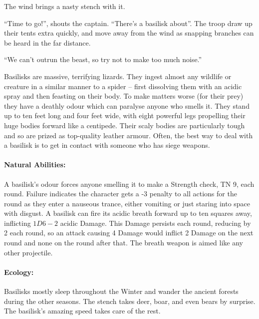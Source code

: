 \begin{multicols}{2}
\label{basilisk}
\basilisk

\begin{boxtext}

	The wind brings a nasty stench with it.

	``Time to go!'', shouts the captain.
	``There's a basilisk about''.
	The troop draw up their tents extra quickly, and move away from the wind as snapping branches can be heard in the far distance.

	``We can't outrun the beast, so try not to make too much noise.''

\end{boxtext}

Basilisks are massive, terrifying lizards.
They ingest almost any wildlife or creature in a similar manner to a spider -- first dissolving them with an acidic spray and then feasting on their body.
To make matters worse (for their prey) they have a deathly odour which can paralyse anyone who smells it.
They stand up to ten feet long and four feet wide, with eight powerful legs propelling their huge bodies forward like a centipede.
Their scaly bodies are particularly tough and so are prized as top-quality leather armour.
Often, the best way to deal with a basilisk is to get in contact with someone who has siege weapons.

\paragraph{Natural Abilities:} A basilisk's odour forces anyone smelling it to make a Strength check, TN 9, each round.
Failure indicates the character gets a -3 penalty to all actions for the round as they enter a nauseous trance, either vomiting or just staring into space with disgust.
A basilisk can fire its acidic breath forward up to ten squares away, inflicting $1D6-2$ acidic Damage.
This Damage persists each round, reducing by 2  each round, so an attack causing 4 Damage would inflict 2  Damage on the next round and none on the round after that.
The breath weapon is aimed like any other projectile.

\paragraph{Ecology:} Basilisks mostly sleep throughout the Winter and wander the ancient forests during the other seasons.
The stench takes deer, boar, and even bears by surprise.
The basilisk's amazing speed takes care of the rest.


\end{multicols}
